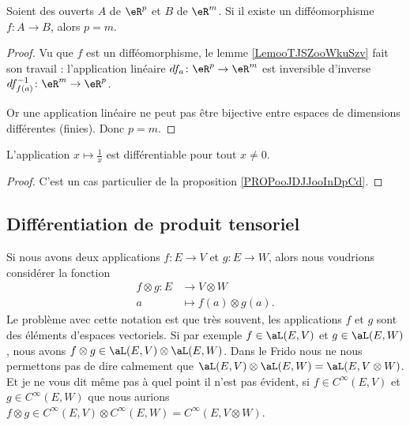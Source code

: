 \begin{proposition}     \label{PROPooNONAooCyAtce}
	Soient des ouverts \( A\) de \( \eR^p\) et \( B\) de \( \eR^m\). Si il existe un difféomorphisme \( f\colon A\to B\), alors \( p=m\).
\end{proposition}

\begin{proof}
	Vu que \( f\) est un difféomorphisme, le lemme \ref{LemooTJSZooWkuSzv} fait son travail : l'application linéaire \( df_a\colon \eR^p\to \eR^m\) est inversible d'inverse \( df^{-1}_{f(a)}\colon \eR^m\to \eR^p\).

	Or une application linéaire ne peut pas être bijective entre espaces de dimensions différentes (finies). Donc \( p=m\).
\end{proof}


\begin{proposition}	\label{PROPooQWIUooFaNzTx}
	L'application \( x\mapsto \frac{1}{ x}\) est différentiable pour tout \( x\neq 0\).
\end{proposition}

\begin{proof}
	C'est un cas particulier de la proposition \ref{PROPooJDJJooInDpCd}.
\end{proof}

\subsection{Différentiation de produit tensoriel}

Si nous avons deux applications \( f\colon E\to V\) et \( g\colon E\to W\), alors nous voudrions considérer la fonction
\begin{equation}
	\begin{aligned}
		f\otimes g\colon E & \to V\otimes W            \\
		a                  & \mapsto f(a)\otimes g(a).
	\end{aligned}
\end{equation}
Le problème avec cette notation est que très souvent, les applications \( f\) et \( g\) sont des éléments d'espaces vectoriels. Si par exemple \( f\in \aL(E,V)\) et \( g\in \aL(E,W)\), nous avons \( f\otimes g\in \aL(E,V)\otimes \aL(E,W)\). Dans le Frido nous ne nous permettons pas de dire calmement que \( \aL(E,V)\otimes \aL(E,W)=\aL(E,V\otimes W)\). Et je ne vous dit même pas à quel point il n'est pas évident, si \( f\in C^{\infty}(E,V)\) et \( g\in  C^{\infty}(E,W)\) que nous aurions \( f\otimes g\in C^{\infty}(E,V)\otimes  C^{\infty}(E,W)= C^{\infty}(E,V\otimes W)\).

